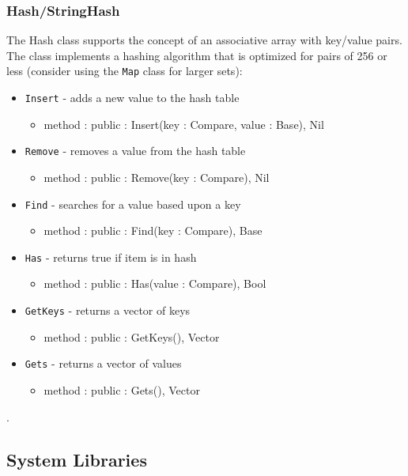 \documentclass[12pt]{article}
\begin{document}
\subsubsection{Hash/StringHash}
The Hash class supports the concept of an associative array with key/value pairs.  The class implements a hashing algorithm that is optimized for pairs of 256 or less  (consider using the \texttt{Map} class for larger sets):
\begin{itemize}
    \item \texttt{Insert} - adds a new value to the hash table
    	\begin{itemize}
	\item method : public : Insert(key : Compare, value : Base), Nil
	\end{itemize}
    \item \texttt{Remove} - removes a value from the hash table
    	\begin{itemize}
	\item method : public : Remove(key : Compare), Nil
	\end{itemize}
    \item \texttt{Find} - searches for a value based upon a key
    	\begin{itemize}
	\item method : public : Find(key : Compare), Base
	\end{itemize}
    \item \texttt{Has} - returns true if item is in hash
    	\begin{itemize}
	\item method : public : Has(value : Compare), Bool
	\end{itemize}
    \item \texttt{GetKeys} - returns a vector of keys
    	\begin{itemize}
	\item method : public : GetKeys(), Vector
	\end{itemize}
    \item \texttt{Gets} - returns a vector of values
    	\begin{itemize}
	\item method : public : Gets(), Vector
	\end{itemize}
\end{itemize}.

\subsection{System Libraries}
\end{document}
